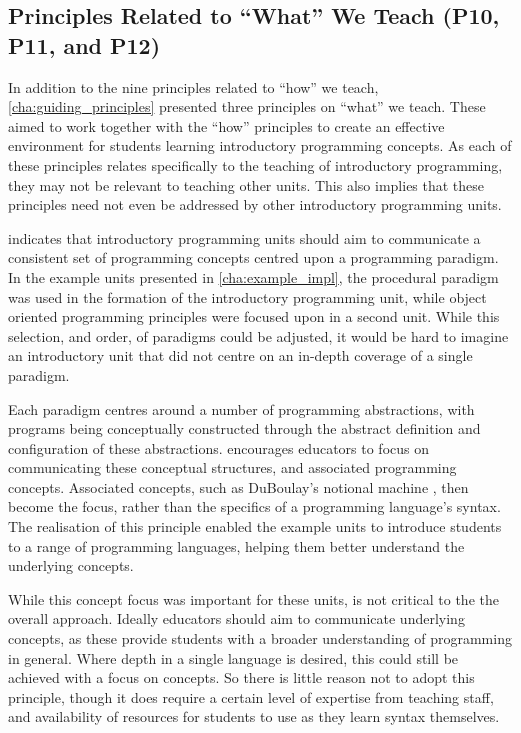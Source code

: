 


\subsection{Principles Related to ``What'' We Teach (P10, P11, and P12) } %
\label{sub:principles_related_to_}

In addition to the nine principles related to ``how'' we teach, \cref{cha:guiding_principles} presented three principles on ``what'' we teach. These aimed to work together with the ``how'' principles to create an effective environment for students learning introductory programming concepts. As each of these principles relates specifically to the teaching of introductory programming, they may not be relevant to teaching other units. This also implies that these principles need not even be addressed by other introductory programming units.

 indicates that introductory programming units should aim to communicate a  consistent set of programming concepts centred upon a programming paradigm. In the example units presented in \cref{cha:example_impl}, the procedural paradigm was used in the formation of the introductory programming unit, while object oriented programming principles were focused upon in a second unit. While this selection, and order, of paradigms could be adjusted, it would be hard to imagine an introductory unit that did not centre on an in-depth coverage of a single paradigm.  

Each paradigm centres around a number of programming abstractions, with programs being conceptually constructed through the abstract definition and configuration of these abstractions.  encourages educators to focus on communicating these conceptual structures, and associated programming concepts. Associated concepts, such as DuBoulay's notional machine \cite{DuBoulay:1986}, then become the focus, rather than the specifics of a programming language's syntax. The realisation of this principle enabled the example units to introduce students to a range of programming languages, helping them better understand the underlying concepts. 

While this concept focus was important for these units,  is not critical to the the overall approach. Ideally educators should aim to communicate underlying concepts, as these provide students with a broader understanding of programming in general. Where depth in a single language is desired, this could still be achieved with a focus on concepts. So there is little reason not to adopt this principle, though it does require a certain level of expertise from teaching staff, and availability of resources for students to use as they learn syntax themselves.  

